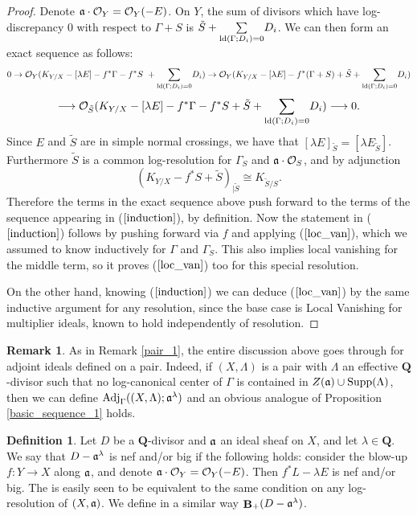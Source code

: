 \documentclass[11pt]{amsart}
\theoremstyle{plain}
\theoremstyle{definition}
\newtheorem{definition}[theorem]{Definition}
\newtheorem{remark}[theorem]{Remark}
\newcommand{\QQ}{\mathbf{Q}}
\newcommand{\OO}{\mathcal  {O}}
\newcommand{\fra}{\frak{a}}
\newcommand{\Adj}{{\rm Adj}}
\DeclareMathOperator{\BB}{{\bf B}}
\begin{document}
\begin{proof}
Denote $\fra\cdot \OO_Y = \OO_Y(-E)$. On $Y$, the sum of divisors which have log-discrepancy $0$ with respect to $\Gamma + S$ is 
$\tilde S + \underset{{\rm ld}(\Gamma; D_i)=0}{\sum} D_i$. We can then form an exact sequence as follows: 
$$0 \rightarrow \OO_Y( K_{Y/X} - [\lambda E] - f^*\Gamma - f^*S ~ + \underset{{\rm ld}(\Gamma; D_i)=0}{\sum} D_i) \rightarrow 
\OO_Y( K_{Y/X} - [\lambda E] - f^*(\Gamma + S) + \tilde S + \underset{{\rm ld}(\Gamma; D_i)=0}{\sum} D_i)$$
$$ \longrightarrow 
\OO_{\tilde S}(K_{Y/X} - [\lambda E] - f^*\Gamma - f^*S + \tilde S + \underset{{\rm ld}(\Gamma; D_i)=0}{\sum} D_i) \longrightarrow 0.$$
Since $E$ and $\tilde S$ are in simple normal crossings, we
have that $[\lambda E]_{\tilde S} = [\lambda E_{\tilde S}]$. Furthermore $\tilde S$ is a common log-resolution for $\Gamma_S$ and $\fra\cdot \OO_S$, and by adjunction 
$$(K_{Y/X} - f^*S + \tilde S)_{|\tilde S} \cong K_{\tilde S /S}.$$ 
Therefore the terms in the exact sequence above push forward to the terms of the sequence appearing in ($\ref{induction}$), by definition. Now the statement in ($\ref{induction}$) follows by pushing forward via $f$ and applying ($\ref{loc_van}$), which we assumed to know inductively for $\Gamma$ and $\Gamma_S$. This also implies local vanishing for the middle term, so it proves ($\ref{loc_van}$) too for 
this special resolution.

On the other hand, knowing ($\ref{induction}$) we can deduce ($\ref{loc_van}$) by the same inductive argument for any resolution, since the base case is Local Vanishing for multiplier ideals, known to hold independently of resolution. 
\end{proof}


\begin{remark}\label{pair_2}
As in Remark \ref{pair_1}, the entire discussion above goes through for adjoint ideals defined on a pair. Indeed, if $(X, \Lambda)$ is a pair with $\Lambda$ an  effective $\QQ$-divisor such that no log-canonical center of $\Gamma$ is contained in $Z(\fra) \cup {\rm Supp}(\Lambda)$, then we can define 
$\Adj_{\Gamma} ((X,\Lambda); \fra^{\lambda})$
and an obvious analogue of Proposition \ref{basic_sequence_1} holds.
\end{remark}

\begin{definition}\label{variation}
Let $D$ be a $\QQ$-divisor and $\fra$ an ideal sheaf on $X$, and let $\lambda\in \QQ$. We say that $D - \fra^{\lambda}$ is nef and/or big 
if the following holds: consider the blow-up $f: Y \rightarrow X$ along $\fra$, and denote $\fra\cdot \OO_Y = \OO_Y(-E)$. Then 
$f^* L - \lambda E$ is nef and/or big. The is easily seen to be equivalent to the same condition on any log-resolution of $(X, \fra)$.
We define in a similar way $\BB_{+} (D - \fra^{\lambda})$.
\end{definition}
\end{document}
